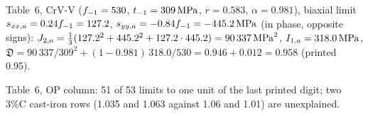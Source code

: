  Table~6, CrV-V ($f_{-1}=530$, $t_{-1}=309\,\mathrm{MPa}$, $r=0.583$, $\alpha=0.981$), biaxial
limit $s_{xx,a}=0.24f_{-1}=127.2$, $s_{yy,a}=-0.84f_{-1}=-445.2\,\mathrm{MPa}$ (in phase, opposite signs):
$J_{2,a}=\tfrac13(127.2^2+445.2^2+127.2\cdot445.2)=90\,337\,\mathrm{MPa}^2$, $I_{1,a}=318.0\,\mathrm{MPa}$,
$\mathfrak D = 90\,337/309^2 + (1-0.981)\,318.0/530 = 0.946+0.012 = 0.958$ (printed 0.95).

 Table~6, OP column: 51 of 53 limits to one unit of the last printed digit;
two 3\%C cast-iron rows (1.035 and 1.063 against 1.06 and 1.01) are unexplained.

